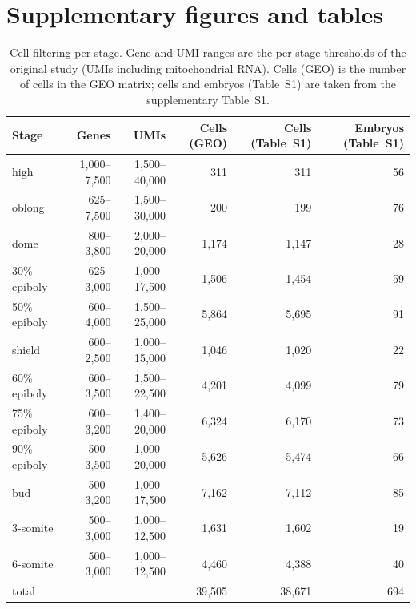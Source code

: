 \documentclass[11pt,a4paper]{article}
\begin{document}
\clearpage



\clearpage
\appendix
\section{Supplementary figures and tables}
\label{sec:supplementary}
\setcounter{figure}{0}
\setcounter{table}{0}
\renewcommand{\thefigure}{S\arabic{figure}}
\renewcommand{\thetable}{S\arabic{table}}
\renewcommand{\theHfigure}{S\arabic{figure}}
\renewcommand{\theHtable}{S\arabic{table}}

{\footnotesize
\setlength{\tabcolsep}{3pt}
\setlength{\LTcapwidth}{\textwidth}

}

\begin{table}[htbp]
	\centering
	\small
	\caption{Cell filtering per stage. Gene and UMI ranges are the per-stage thresholds of the original study (UMIs including mitochondrial RNA). Cells (GEO) is the number of cells in the GEO matrix; cells and embryos (Table~S1) are taken from the supplementary Table~S1.}
	\label{tab:filtering}
	\begin{tabular}{lrrrrr}
		\toprule
		Stage & Genes & UMIs & Cells (GEO) & Cells (Table~S1) & Embryos (Table~S1) \\
		\midrule
		high & 1{,}000--7{,}500 & 1{,}500--40{,}000 & 311 & 311 & 56 \\
		oblong & 625--7{,}500 & 1{,}500--30{,}000 & 200 & 199 & 76 \\
		dome & 800--3{,}800 & 2{,}000--20{,}000 & 1{,}174 & 1{,}147 & 28 \\
		30\% epiboly & 625--3{,}000 & 1{,}000--17{,}500 & 1{,}506 & 1{,}454 & 59 \\
		50\% epiboly & 600--4{,}000 & 1{,}500--25{,}000 & 5{,}864 & 5{,}695 & 91 \\
		shield & 600--2{,}500 & 1{,}000--15{,}000 & 1{,}046 & 1{,}020 & 22 \\
		60\% epiboly & 600--3{,}500 & 1{,}500--22{,}500 & 4{,}201 & 4{,}099 & 79 \\
		75\% epiboly & 600--3{,}200 & 1{,}400--20{,}000 & 6{,}324 & 6{,}170 & 73 \\
		90\% epiboly & 500--3{,}500 & 1{,}000--20{,}000 & 5{,}626 & 5{,}474 & 66 \\
		bud & 500--3{,}200 & 1{,}000--17{,}500 & 7{,}162 & 7{,}112 & 85 \\
		3-somite & 500--3{,}000 & 1{,}000--12{,}500 & 1{,}631 & 1{,}602 & 19 \\
		6-somite & 500--3{,}000 & 1{,}000--12{,}500 & 4{,}460 & 4{,}388 & 40 \\
		\midrule
		total & & & 39{,}505 & 38{,}671 & 694 \\
		\bottomrule
	\end{tabular}
\end{table}
\end{document}
